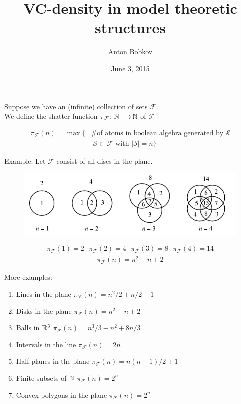 \documentclass{beamer}
\title{VC-density in model theoretic structures}
\author{Anton Bobkov}
\date{June 3, 2015}
\newcommand{\F}{\mathcal F}
\begin{document}
\maketitle

\begin{frame}
	Suppose we have an (infinite) collection of sets $\F$. \\
	We define the shatter function $\pi_\F \colon \N \arr \N$ of $\F$

	\begin{align*}
		\pi_\F(n) = \max \{ &\text {\# of atoms in boolean algebra generated by $\mathcal S$} \\
		            &\mid \mathcal S \subset \F \text{ with } |\mathcal S| = n\}
	\end{align*}
\end{frame}

\begin{frame}
	Example: Let $\F$ consist of all discs in the plane.
	\begin{figure}[p]
    \centering
    \includegraphics[scale=0.75]{circle.png}
	\end{figure}
	\begin{align*}
		\pi_\F(1) = 2 \ \ \  \pi_\F(2) = 4 \ \ \  \pi_\F(3) = 8  \ \ \ \pi_\F(4) = 14
	\end{align*}
	\begin{align*}
		\pi_\F(n) = n^2 - n + 2
	\end{align*}
\end{frame}

\begin{frame}
More examples: \\
	\begin{enumerate}
		\item Lines in the plane $\pi_\F(n) = n^2/2 + n/2 + 1$
		\item Disks in the plane	$\pi_\F(n) = n^2 - n + 2$
		\item Balls in $\mathbb{R}^3$  $\pi_\F(n) = n^3/3 - n^2 + 8n/3$
		\item Intervals in the line $\pi_\F(n) = 2n$
		\item Half-planes in the plane $\pi_\F(n) = n(n+1)/2 + 1$
		\item Finite subsets of $\mathbb{N}$ $\pi_\F(n) = 2^n$
		\item Convex polygons in the plane $\pi_\F(n) = 2^n$
	\end{enumerate}
\end{frame}
\end{document}
